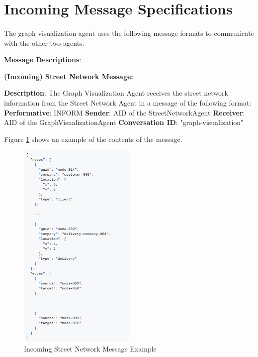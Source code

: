 \documentclass[11pt, a4paper]{article}
\begin{document}
\section{Incoming Message Specifications}\label{MessageSpecifications}
\paragraph{}
The graph visualization agent uses the following message formats to communicate with the other two agents.

\hfill\break
\textbf{Message Descriptions}:

\hfill\break
\textbf{(Incoming) Street Network Message:}

\hfill\break
\textbf{Description}:
The Graph Visualization Agent receives the street network information from the Street Network Agent in a message of the following format:
\hfill\break
\textbf{Performative}: INFORM
\hfill\break
\textbf{Sender}: AID of the StreetNetworkAgent
\hfill\break
\textbf{Receiver}:  AID of the GraphVisualizationAgent
\hfill\break
\textbf{Conversation ID}: "graph-visualization"

\hfill\break
Figure \ref{graphVisSNmsgexample} shows an example of the contents of the message.

\begin{figure}[h!]
	\centering
	\includegraphics[width=0.5\textwidth]{../images/graphVisSNmsgexample.png}
	\caption{Incoming Street Network Message Example}
	\label{graphVisSNmsgexample}
\end{figure}
\end{document}
